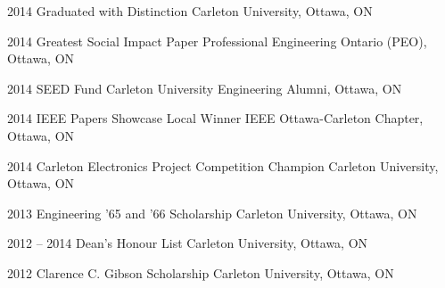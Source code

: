 \documentclass[]{friggeri-cv} %
\begin{document}
\begin{entrylist}
\entry
{2014}
{Graduated with Distinction}
{Carleton University, Ottawa, ON}
{}
\vspace{-7pt}

\entry
{2014}
{Greatest Social Impact Paper}
{Professional Engineering Ontario (PEO), Ottawa, ON}
{}
\vspace{-7pt}

\entry
{2014}
{SEED Fund}
{Carleton University Engineering Alumni, Ottawa, ON}
{}
\vspace{-7pt}

\entry
{2014}
{IEEE Papers Showcase Local Winner}
{IEEE Ottawa-Carleton Chapter, Ottawa, ON}
{}
\vspace{-7pt}

\entry
{2014}
{Carleton Electronics Project Competition Champion}
{Carleton University, Ottawa, ON}
{}
\vspace{-7pt}

\entry
{2013}
{Engineering '65 and '66 Scholarship}
{Carleton University, Ottawa, ON}
{}
\vspace{-7pt}

\entry
{2012 -- 2014}
{Dean's Honour List}
{Carleton University, Ottawa, ON}
{}
\vspace{-7pt}

\entry
{2012}
{Clarence C. Gibson Scholarship}
{Carleton University, Ottawa, ON}
{}
\vspace{-7pt}
\end{entrylist}

\clearpage
\end{document}

